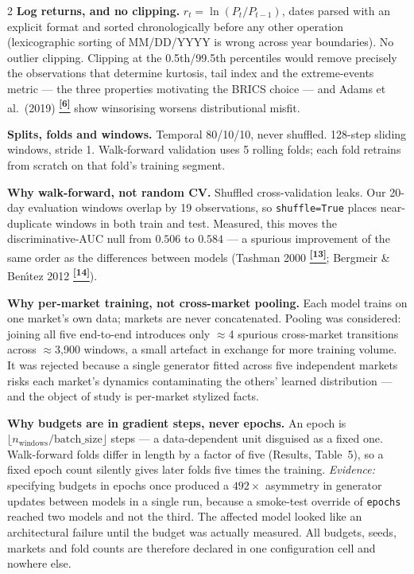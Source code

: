 \documentclass[10pt]{article}
\newcommand{\tcite}[1]{%
  \hyperlink{R:#1}{\textsuperscript{\scriptsize\textbf{[#1]}}}}
\begin{document}
\begin{multicols}{2}
\smallskip
\textbf{Log returns, and no clipping.}
$r_t = \ln(P_t/P_{t-1})$, dates parsed with an explicit format and sorted chronologically before any other operation (lexicographic sorting of MM/DD/YYYY is wrong across year boundaries). No outlier clipping. Clipping at the 0.5th/99.5th percentiles would remove precisely the observations that determine kurtosis, tail index and the extreme-events metric --- the three properties motivating the BRICS choice --- and Adams et al.\ (2019)\tcite{6} show winsorising worsens distributional misfit.

\smallskip
\textbf{Splits, folds and windows.}
Temporal 80/10/10, never shuffled. 128-step sliding windows, stride 1. Walk-forward validation uses 5 rolling folds; each fold retrains from scratch on that fold's training segment.

\smallskip
\textbf{Why walk-forward, not random CV.}
Shuffled cross-validation leaks. Our 20-day evaluation windows overlap by 19 observations, so \texttt{shuffle=True} places near-duplicate windows in both train and test. Measured, this moves the discriminative-AUC null from $0.506$ to $0.584$ --- a spurious improvement of the same order as the differences between models (Tashman 2000\tcite{13}; Bergmeir \& Ben\'{\i}tez 2012\tcite{14}).

\smallskip
\textbf{Why per-market training, not cross-market pooling.}
Each model trains on one market's own data; markets are never concatenated. Pooling was considered: joining all five end-to-end introduces only $\approx$4 spurious cross-market transitions across $\approx$3{,}900 windows, a small artefact in exchange for more training volume. It was rejected because a single generator fitted across five independent markets risks each market's dynamics contaminating the others' learned distribution --- and the object of study is per-market stylized facts.

\columnbreak

\textbf{Why budgets are in gradient steps, never epochs.}
An epoch is $\lfloor n_\text{windows}/\text{batch\_size}\rfloor$ steps --- a data-dependent unit disguised as a fixed one. Walk-forward folds differ in length by a factor of five (Results, Table~5), so a fixed epoch count silently gives later folds five times the training. \textit{Evidence:} specifying budgets in epochs once produced a $492\times$ asymmetry in generator updates between models in a single run, because a smoke-test override of \texttt{epochs} reached two models and not the third. The affected model looked like an architectural failure until the budget was actually measured. All budgets, seeds, markets and fold counts are therefore declared in one configuration cell and nowhere else.


\end{multicols}
\end{document}
